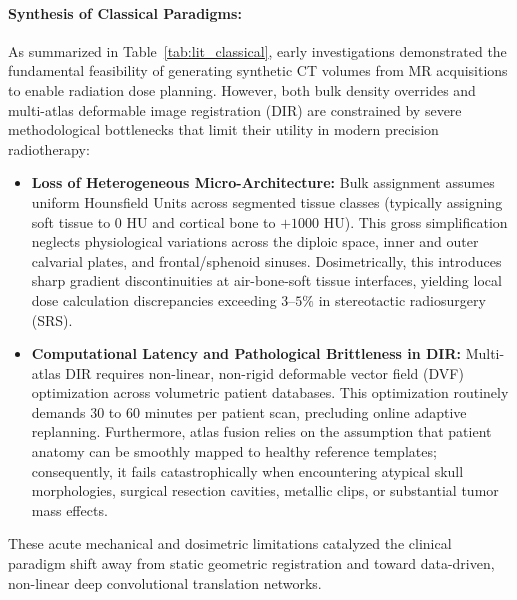 \paragraph{Synthesis of Classical Paradigms:}
As summarized in Table~\ref{tab:lit_classical}, early investigations demonstrated the fundamental feasibility of generating synthetic CT volumes from MR acquisitions to enable radiation dose planning. However, both bulk density overrides and multi-atlas deformable image registration (DIR) are constrained by severe methodological bottlenecks that limit their utility in modern precision radiotherapy:
\begin{itemize}
    \item \textbf{Loss of Heterogeneous Micro-Architecture:} Bulk assignment assumes uniform Hounsfield Units across segmented tissue classes (typically assigning soft tissue to $0\text{ HU}$ and cortical bone to $+1000\text{ HU}$). This gross simplification neglects physiological variations across the diploic space, inner and outer calvarial plates, and frontal/sphenoid sinuses. Dosimetrically, this introduces sharp gradient discontinuities at air-bone-soft tissue interfaces, yielding local dose calculation discrepancies exceeding $3\text{--}5\%$ in stereotactic radiosurgery (SRS).
    \item \textbf{Computational Latency and Pathological Brittleness in DIR:} Multi-atlas DIR requires non-linear, non-rigid deformable vector field (DVF) optimization across volumetric patient databases. This optimization routinely demands 30 to 60 minutes per patient scan, precluding online adaptive replanning. Furthermore, atlas fusion relies on the assumption that patient anatomy can be smoothly mapped to healthy reference templates; consequently, it fails catastrophically when encountering atypical skull morphologies, surgical resection cavities, metallic clips, or substantial tumor mass effects.
\end{itemize}
These acute mechanical and dosimetric limitations catalyzed the clinical paradigm shift away from static geometric registration and toward data-driven, non-linear deep convolutional translation networks.

\vspace{10pt}
